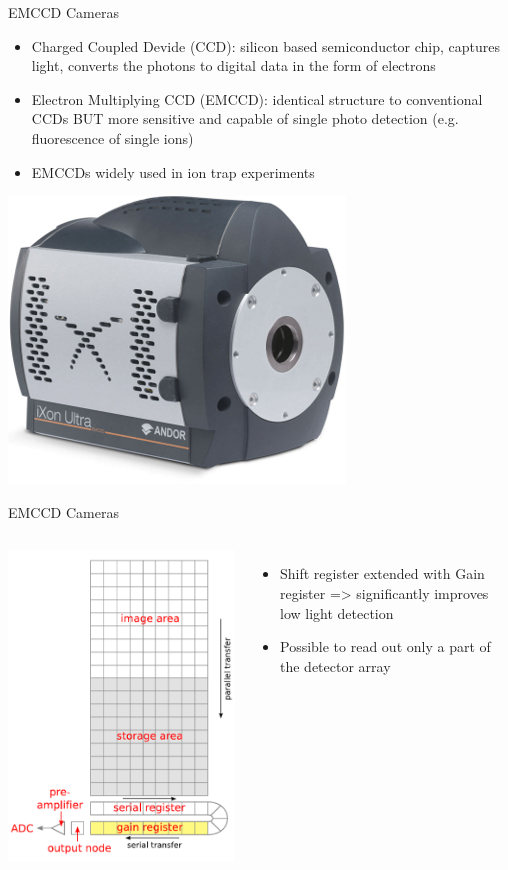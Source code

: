 \documentclass{beamer}
\begin{document}
\begin{frame}{EMCCD Cameras}

\begin{itemize}
\item Charged Coupled Devide (CCD): silicon based semiconductor chip, captures light, converts the photons to digital data in the form of electrons
\bigskip
\item Electron Multiplying CCD (EMCCD):  identical structure to conventional CCDs BUT more sensitive and capable of single photo detection (e.g. fluorescence of single ions)
\bigskip
\item EMCCDs widely used in ion trap experiments
\end{itemize}

\centering
\includegraphics[scale=0.38]{Figures/iXon-Ultra-897.png}

\end{frame}


\begin{frame}{EMCCD Cameras}

\begin{columns}
             \centering
             \includegraphics[width=4.3 cm]{Figures/EMCCD_Structure.PNG}
              \begin{itemize}
\item Shift register extended with Gain register => significantly improves low light detection
\bigskip
\item Possible to read out only a part of the detector array
\end{itemize}
         \end{columns} 


\end{frame}
\end{document}
